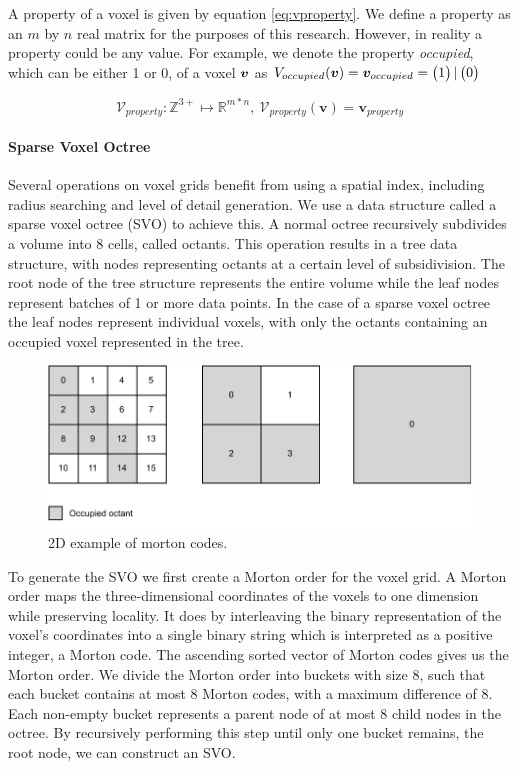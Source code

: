 A property of a voxel is given by equation \ref{eq:vproperty}. We define a property as an \(m\) by \(n\) real matrix for the purposes of this research. However, in reality a property could be any value. For example, we denote the property \textit{occupied}, which can be either 1 or 0, of a voxel \(\boldsymbol{v}\) as \(V_{occupied}(\boldsymbol{v}) = \boldsymbol{v}_{occupied} = \begin{pmatrix} 1 \end{pmatrix} | \begin{pmatrix} 0 \end{pmatrix}\)

\begin{equation}
    \label{eq:vproperty}
    \mathcal{V}_{property}: \mathbb{Z}^{3+} \mapsto \mathbb{R}^{m*n},\ \mathcal{V}_{property}(\boldsymbol{v}) = \boldsymbol{v}_{property}
\end{equation}


\paragraph{Sparse Voxel Octree}
Several operations on voxel grids benefit from using a spatial index, including radius searching and level of detail generation. We use a data structure called a sparse voxel octree (SVO) to achieve this. A normal octree recursively subdivides a volume into 8 cells, called octants. This operation results in a tree data structure, with nodes representing octants at a certain level of subsidivision. The root node of the tree structure represents the entire volume while the leaf nodes represent batches of 1 or more data points. In the case of a sparse voxel octree the leaf nodes represent individual voxels, with only the octants containing an occupied voxel represented in the tree. 

\begin{figure}[h]
    \centering
    \includegraphics*[width=.7\textwidth]{./fig/morton_code.pdf}
    \caption{2D example of morton codes.}
    \label{fig:vg_morton}
\end{figure}

To generate the SVO we first create a Morton order for the voxel grid. A Morton order maps the three-dimensional coordinates of the voxels to one dimension while preserving locality. It does by interleaving the binary representation of the voxel's coordinates into a single binary string which is interpreted as a positive integer, a Morton code. The ascending sorted vector of Morton codes gives us the Morton order. We divide the Morton order into buckets with size 8, such that each bucket contains at most 8 Morton codes, with a maximum difference of 8. Each non-empty bucket represents a parent node of at most 8 child nodes in the octree. By recursively performing this step until only one bucket remains, the root node, we can construct an SVO.

